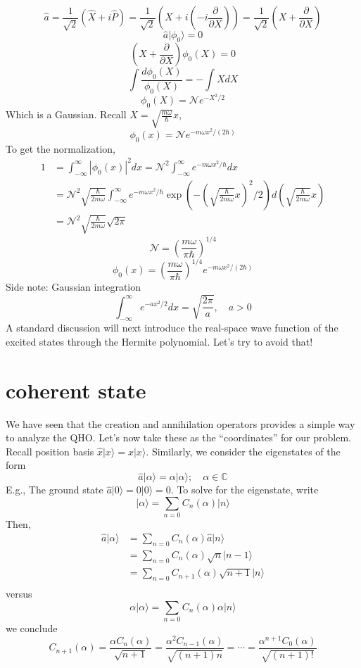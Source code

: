 \[ \hat{a}=\frac{1}{\sqrt{2}}\left( \hat{X}+i\hat{P} \right) =\frac{1}{\sqrt{2}}\left( X+i\left( -i\frac{\partial}{\partial X} \right) \right) =\frac{1}{\sqrt{2}}\left( X+\frac{\partial}{\partial X} \right) \]
\[ \hat{a}|\phi _0\rangle =0 \]
\[ \left( X+\frac{\partial}{\partial X} \right) \phi _0\left( X \right) =0 \]
\[ \int{\frac{d\phi _0\left( X \right)}{\phi _0\left( X \right)}}=-\int{XdX}\]
\[ \phi _0\left( X \right) =\mathcal{N} e^{-X^2/2}\]
Which is a Gaussian. Recall $X=\sqrt{\frac{m\omega}{\hbar}}x$,
\[ \phi _0\left( x \right) =\mathcal{N} e^{-m\omega x^2/\left( 2\hbar \right)} \]
To get the normalization,
\begin{align*}
    1&=\int_{-\infty}^{\infty}{\left| \phi _0\left( x \right) \right|^2 dx}=\mathcal{N} ^2\int_{-\infty}^{\infty}{e^{-m\omega x^2/\hbar}dx}\\
    &=\mathcal{N} ^2\sqrt{\frac{\hbar}{2m\omega}}\int_{-\infty}^{\infty}{e^{-m\omega x^2/\hbar}\exp \left( -\left( \sqrt{\frac{\hbar}{2m\omega}}x \right) ^2/2 \right) d\left( \sqrt{\frac{\hbar}{2m\omega}}x \right)}\\
    &=\mathcal{N} ^2\sqrt{\frac{\hbar}{2m\omega}}\sqrt{2\pi}
\end{align*}
\[ \mathcal{N} =\left( \frac{m\omega}{\pi \hbar} \right) ^{1/4} \]
\[ \phi _0\left( x \right) =\left( \frac{m\omega}{\pi \hbar} \right) ^{1/4}e^{-m\omega x^2/\left( 2\hbar \right)} \]
Side note: Gaussian integration
\[ \int_{-\infty}^{\infty}{e^{-ax^2/2}dx}=\sqrt{\frac{2\pi}{a}},\quad a>0 \]
A standard discussion will next introduce the real-space wave function of the excited states through the Hermite polynomial. Let's try to avoid that!

\section{coherent state}

We have seen that the creation and annihilation operators provides a simple way to analyze the QHO. Let's now take these as the ``coordinates'' for our problem. Recall position basis $\hat{x}|x\rangle =x|x\rangle$. Similarly, we consider the eigenstates of the form
\[ \hat{a}|\alpha \rangle =\alpha |\alpha \rangle ;\quad \alpha \in \mathbb{C} \]
E.g., The ground state $\hat{a}|0\rangle =0|0\rangle =0$. To solve for the eigenstate, write
\[ |\alpha \rangle =\sum_{n=0}{C_n\left( \alpha \right) |n\rangle}\]
Then,
\begin{align*}
    \hat{a}|\alpha \rangle &=\sum_{n=0}{C_n\left( \alpha \right) \hat{a}|n\rangle}\\
    &=\sum_{n=0}{C_n\left( \alpha \right) \sqrt{n}|n-1\rangle}\\
    &=\sum_{n=0}{C_{n+1}\left( \alpha \right) \sqrt{n+1}|n\rangle}\\
\end{align*}
versus
\[ \alpha |\alpha \rangle =\sum_{n=0}{C_n\left( \alpha \right) \alpha |n\rangle}\]
we conclude
\[ C_{n+1}\left( \alpha \right) =\frac{\alpha C_n\left( \alpha \right)}{\sqrt{n+1}}=\frac{\alpha ^2C_{n-1}\left( \alpha \right)}{\sqrt{\left( n+1 \right) n}}=\cdots =\frac{\alpha ^{n+1}C_0\left( \alpha \right)}{\sqrt{\left( n+1 \right) !}} \]

